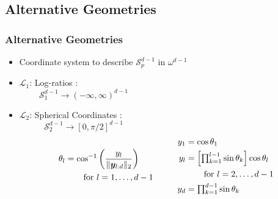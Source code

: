\documentclass[aspectratio=169]{beamer}
\begin{document}
\subsection*{Alternative Geometries}
\begin{frame}
  \frametitle{Alternative Geometries}
  \small
  \begin{itemize}
    \item Coordinate system to describe $\mathcal{S}_p^{d-1}$ in $\omega^{d-1}$
    \item $\mathcal{L}_1$: Log-ratios \citep{aitchison1982}:
        \begin{equation*}
            \mathcal{S}_1^{d-1} \rightarrow (-\infty,\infty)^{d-1}\hspace{8cm}~
        \end{equation*}
    \item $\mathcal{L}_2$: Spherical Coordinates \citep{nunez2019}: 
        \begin{equation*}
            \mathcal{S}_2^{d-1} \rightarrow [0,\pi/2]^{d-1}\hspace{8cm}~
        \end{equation*}
        \vspace{-0.5cm}
      \begin{equation*}
        \begin{aligned}
        \theta_l &= \cos^{-1}\left(\frac{y_l}{\lVert \bm{y}_{l:d}\rVert_2}\right)\\
        &\hspace{0.75cm}\text{for }l = 1,\ldots,d-1
        \end{aligned}
        \hspace{1cm}
        \begin{aligned}
          y_1 &= \cos\theta_1\\
          y_l &= \left[{\textstyle\prod}_{k = 1}^{l-1}\sin\theta_k\right]\cos\theta_l\\
          &\hspace{0.75cm}\text{for }l = 2,\ldots,d-1\\
          y_d &= {\textstyle\prod}_{k = 1}^{d-1}\sin\theta_k
        \end{aligned}
      \end{equation*}
  \end{itemize}
\end{frame}
\end{document}
